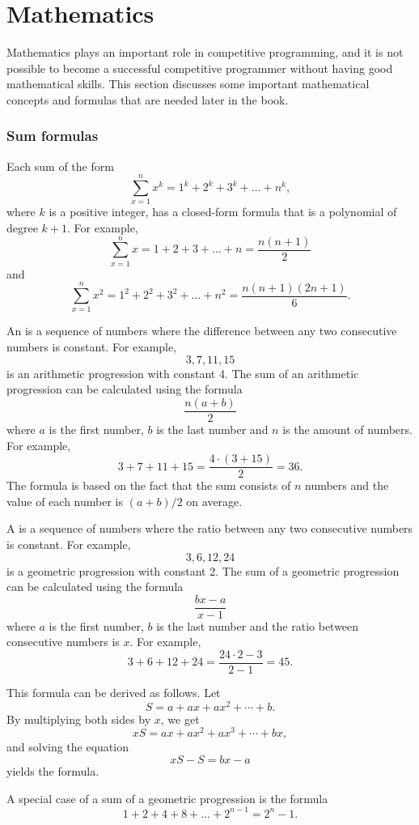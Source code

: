 \section{Mathematics}

Mathematics plays an important role in competitive
programming, and it is not possible to become
a successful competitive programmer without
having good mathematical skills.
This section discusses some important
mathematical concepts and formulas that
are needed later in the book.

\subsubsection{Sum formulas}

Each sum of the form
\[\sum_{x=1}^n x^k = 1^k+2^k+3^k+\ldots+n^k,\]
where $k$ is a positive integer,
has a closed-form formula that is a
polynomial of degree $k+1$.
For example,
\[\sum_{x=1}^n x = 1+2+3+\ldots+n = \frac{n(n+1)}{2}\]
and
\[\sum_{x=1}^n x^2 = 1^2+2^2+3^2+\ldots+n^2 = \frac{n(n+1)(2n+1)}{6}.\]

An  is a 
sequence of numbers
where the difference between any two consecutive
numbers is constant.
For example,
\[3, 7, 11, 15\]
is an arithmetic progression with constant 4.
The sum of an arithmetic progression can be calculated
using the formula
\[\frac{n(a+b)}{2}\]
where $a$ is the first number,
$b$ is the last number and
$n$ is the amount of numbers.
For example,
\[3+7+11+15=\frac{4 \cdot (3+15)}{2} = 36.\]
The formula is based on the fact
that the sum consists of $n$ numbers and
the value of each number is $(a+b)/2$ on average.

A  is a sequence
of numbers
where the ratio between any two consecutive
numbers is constant.
For example,
\[3,6,12,24\]
is a geometric progression with constant 2.
The sum of a geometric progression can be calculated
using the formula
\[\frac{bx-a}{x-1}\]
where $a$ is the first number,
$b$ is the last number and the
ratio between consecutive numbers is $x$.
For example,
\[3+6+12+24=\frac{24 \cdot 2 - 3}{2-1} = 45.\]

This formula can be derived as follows. Let
\[ S = a + ax + ax^2 + \cdots + b .\]
By multiplying both sides by $x$, we get
\[ xS = ax + ax^2 + ax^3 + \cdots + bx,\]
and solving the equation
\[ xS-S = bx-a\]
yields the formula.

A special case of a sum of a geometric progression is the formula
\[1+2+4+8+\ldots+2^{n-1}=2^n-1.\]

